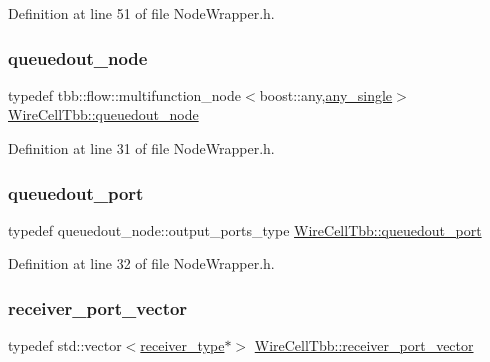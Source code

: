Definition at line 51 of file Node\+Wrapper.\+h.

\mbox{\label{namespace_wire_cell_tbb_ad74c1ae0395c6232cc5f54579a928498}} 
\subsubsection{\texorpdfstring{queuedout\+\_\+node}{queuedout\_node}}
{\footnotesize\ttfamily typedef tbb\+::flow\+::multifunction\+\_\+node$<$boost\+::any,\hyperlink{namespace_wire_cell_tbb_add86809a147ec9695fadae148a7059ea}{any\+\_\+single}$>$ \hyperlink{namespace_wire_cell_tbb_ad74c1ae0395c6232cc5f54579a928498}{Wire\+Cell\+Tbb\+::queuedout\+\_\+node}}



Definition at line 31 of file Node\+Wrapper.\+h.

\mbox{\label{namespace_wire_cell_tbb_a1812565243cb4597d2215ad672e1e991}} 
\subsubsection{\texorpdfstring{queuedout\+\_\+port}{queuedout\_port}}
{\footnotesize\ttfamily typedef queuedout\+\_\+node\+::output\+\_\+ports\+\_\+type \hyperlink{namespace_wire_cell_tbb_a1812565243cb4597d2215ad672e1e991}{Wire\+Cell\+Tbb\+::queuedout\+\_\+port}}



Definition at line 32 of file Node\+Wrapper.\+h.

\mbox{\label{namespace_wire_cell_tbb_a87f42fe8a3ccc3bf9d315cb2d252c7af}} 
\subsubsection{\texorpdfstring{receiver\+\_\+port\+\_\+vector}{receiver\_port\_vector}}
{\footnotesize\ttfamily typedef std\+::vector$<$\hyperlink{namespace_wire_cell_tbb_ae1d3e39f466e5c2d3d5198cab827f73f}{receiver\+\_\+type}$\ast$$>$ \hyperlink{namespace_wire_cell_tbb_a87f42fe8a3ccc3bf9d315cb2d252c7af}{Wire\+Cell\+Tbb\+::receiver\+\_\+port\+\_\+vector}}




